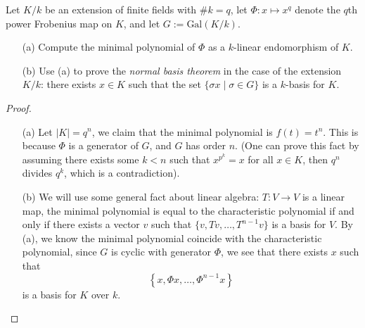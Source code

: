 \documentclass[openany]{book}
\begin{document}
\begin{prob}
    Let \(K/k\) be an extension of finite fields with \(\#k=q\), let \(\Phi\colon x\mapsto x^{q}\) denote the \(q\)th power Frobenius map on \(K\), and let \(G:=\text{Gal}(K/k)\).
    \begin{itemize}
        \item[(a)] Compute the minimal polynomial of \(\Phi\) as a \(k\)-linear endomorphism of \(K\).
        \item[(b)] Use (a) to prove the \textit{normal basis theorem} in the case of the extension \(K/k\): there exists \(x\in K\) such that the set \(\{\sigma x\mid\sigma\in G\}\) is a \(k\)-basis for \(K\).
    \end{itemize}
\end{prob}
\begin{proof}
    \begin{itemize}
        \item[(a)] Let $|K|=q^n$, we claim that the minimal polynomial is $f(t)=t^n$. This is because $\Phi$ is a generator of $G$, and $G$ has order $n$. (One can prove this fact by assuming there exists some $k<n$ such that $x^{p^k}=x$ for all $x\in K$, then $q^n$ divides $q^k$, which is a contradiction).
        \item[(b)] We will use some general fact about linear algebra: $T:V\to V$ is a linear map, the minimal polynomial is equal to the characteristic polynomial if and only if there exists a vector $v$ such that  $\{v, Tv,\dots, T^{n-1}v\}$ is a basis for $V$. By (a), we know the minimal polynomial coincide with the characteristic polynomial, since $G$ is cyclic with generator $\Phi$, we see that there exists $x$ such that
        \begin{equation*}
            \left\{x,\Phi x,\dots, \Phi^{n-1}x\right\}
        \end{equation*}
        is a basis for $K$ over $k$.
    \end{itemize}
\end{proof}
\end{document}
